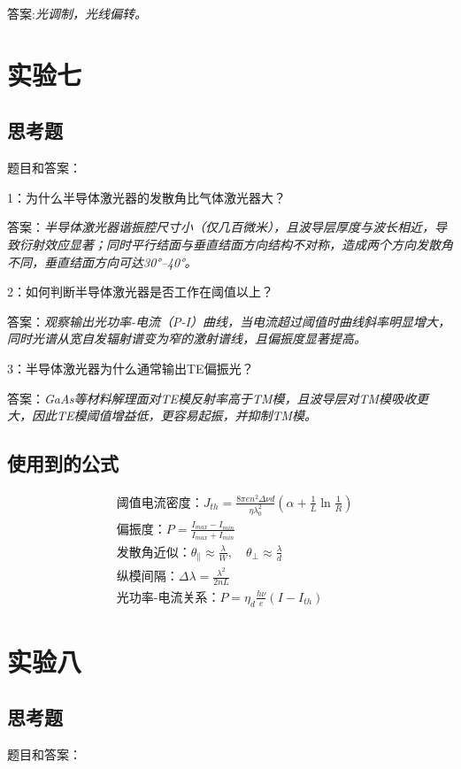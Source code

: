 \documentclass[10pt,journal,compsoc]{IEEEtran}
\begin{document}
答案:\textit{光调制，光线偏转。}
\section{实验七}
\subsection{思考题}
题目和答案：

1：为什么半导体激光器的发散角比气体激光器大？

答案：\textit{半导体激光器谐振腔尺寸小（仅几百微米），且波导层厚度与波长相近，导致衍射效应显著；同时平行结面与垂直结面方向结构不对称，造成两个方向发散角不同，垂直结面方向可达30°–40°。}

2：如何判断半导体激光器是否工作在阈值以上？

答案：\textit{观察输出光功率-电流（P-I）曲线，当电流超过阈值时曲线斜率明显增大，同时光谱从宽自发辐射谱变为窄的激射谱线，且偏振度显著提高。}

3：半导体激光器为什么通常输出TE偏振光？

答案：\textit{GaAs等材料解理面对TE模反射率高于TM模，且波导层对TM模吸收更大，因此TE模阈值增益低，更容易起振，并抑制TM模。}

\subsection{使用到的公式}
\begin{align*}
&\text{阈值电流密度：}J_{th} = \frac{8\pi e n^2 \Delta \nu d}{\eta \lambda_0^2} \left( \alpha + \frac{1}{L} \ln \frac{1}{R} \right) \\
&\text{偏振度：}P = \frac{I_{max} - I_{min}}{I_{max} + I_{min}} \\
&\text{发散角近似：}\theta_\parallel \approx \frac{\lambda}{W},\quad \theta_\perp \approx \frac{\lambda}{d} \\
&\text{纵模间隔：}\Delta \lambda = \frac{\lambda^2}{2nL} \\
&\text{光功率-电流关系：}P = \eta_d \frac{h\nu}{e} (I - I_{th})
\end{align*}

\section{实验八}
\subsection{思考题}
题目和答案：
\end{document}
